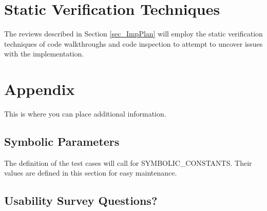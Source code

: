 \documentclass[12pt, titlepage]{article}
\begin{document}
\section{Static Verification Techniques} \label{sec_Static}

The reviews described in Section \ref{sec_ImpPlan} will employ the static 
verification techniques of code walkthroughs and code inspection to attempt to 
uncover issues with the implementation.
				




\newpage

\section{Appendix}

This is where you can place additional information.

\subsection{Symbolic Parameters}

The definition of the test cases will call for SYMBOLIC\_CONSTANTS.
Their values are defined in this section for easy maintenance.

\subsection{Usability Survey Questions?}

\end{document}
